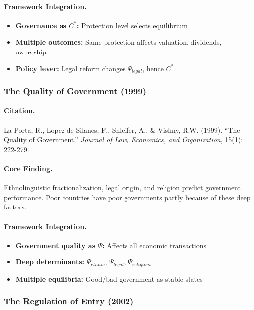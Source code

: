 \paragraph{Framework Integration.}
\begin{itemize}
  \item \textbf{Governance as $C^*$:} Protection level selects equilibrium
  \item \textbf{Multiple outcomes:} Same protection affects valuation, dividends, ownership
  \item \textbf{Policy lever:} Legal reform changes $\Psi_{legal}$, hence $C^*$
\end{itemize}

\subsubsection{The Quality of Government (1999)}

\paragraph{Citation.}
La Porta, R., Lopez-de-Silanes, F., Shleifer, A., \& Vishny, R.W. (1999).
``The Quality of Government.''
\emph{Journal of Law, Economics, and Organization}, 15(1): 222-279.

\paragraph{Core Finding.}
Ethnolinguistic fractionalization, legal origin, and religion predict
government performance. Poor countries have poor governments partly
because of these deep factors.

\paragraph{Framework Integration.}
\begin{itemize}
  \item \textbf{Government quality as $\Psi$:} Affects all economic transactions
  \item \textbf{Deep determinants:} $\Psi_{ethnic}$, $\Psi_{legal}$, $\Psi_{religious}$
  \item \textbf{Multiple equilibria:} Good/bad government as stable states
\end{itemize}

\subsubsection{The Regulation of Entry (2002)}

